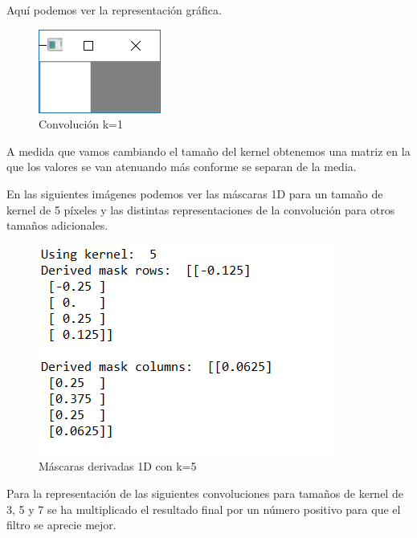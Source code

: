 \documentclass{article}
\begin{document}
Aquí podemos ver la representación gráfica.

\begin{figure}[h]
\centering
\includegraphics[scale=1.1]{1b11.PNG}
\caption{Convolución k=1}
\end{figure}

A medida que vamos cambiando el tamaño del kernel obtenemos una matriz en la que los valores se van atenuando más conforme se separan de la media.

En las siguientes imágenes podemos ver las máscaras 1D para un tamaño de kernel de 5 píxeles y las distintas representaciones de la convolución para otros tamaños adicionales.

\begin{figure}[h]
\centering
\includegraphics[scale=1]{1b3.PNG}
\caption{Máscaras derivadas 1D con k=5}
\end{figure}

Para la representación de las siguientes convoluciones para tamaños de kernel de 3, 5 y 7 se ha multiplicado el resultado final por un número positivo para que el filtro se aprecie mejor.
\end{document}
